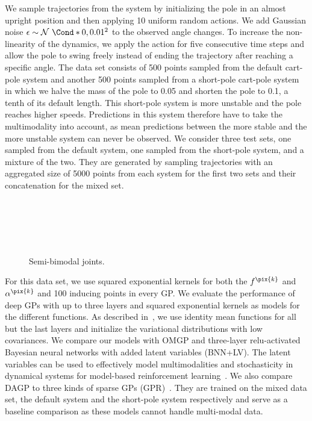 We sample trajectories from the system by initializing the pole in an almost upright position and then applying 10 uniform random actions.
We add Gaussian noise $\epsilon \sim \Gaussian*{0, 0.01^2}$ to the observed angle changes.
To increase the non-linearity of the dynamics, we apply the action for five consecutive time steps and allow the pole to swing freely instead of ending the trajectory after reaching a specific angle.
The data set consists of 500 points sampled from the default cart-pole system and another 500 points sampled from a short-pole cart-pole system in which we halve the mass of the pole to 0.05 and shorten the pole to 0.1, a tenth of its default length.
This short-pole system is more unstable and the pole reaches higher speeds.
Predictions in this system therefore have to take the multimodality into account, as mean predictions between the more stable and the more unstable system can never be observed.
We consider three test sets, one sampled from the default system, one sampled from the short-pole system, and a mixture of the two.
They are generated by sampling trajectories with an aggregated size of 5000 points from each system for the first two sets and their concatenation for the mixed set.
%
\begin{figure}[tp]
    \centering
    \\%
    \\%
    \\%
    \\%
    \caption[DAGP model symmetries]{
        \label{fig:data_association:semi_bimodal_multiple}
        Semi-bimodal joints.
    }
\end{figure}
%

For this data set, we use squared exponential kernels for both the $f^{\pix{k}}$ and $\alpha^{\pix{k}}$ and 100 inducing points in every GP.
We evaluate the performance of deep GPs with up to three layers and squared exponential kernels as models for the different functions.
As described in~\parencite{salimbeni_doubly_2017,kaiser_bayesian_2018}, we use identity mean functions for all but the last layers and initialize the variational distributions with low covariances.
We compare our models with OMGP and three-layer relu-activated Bayesian neural networks with added latent variables (BNN+LV).
The latent variables can be used to effectively model multimodalities and stochasticity in dynamical systems for model-based reinforcement learning~\parencite{depeweg_decomposition_2018}.
We also compare DAGP to three kinds of sparse GPs (GPR)~\parencite{hensman_scalable_2015}.
They are trained on the mixed data set, the default system and the short-pole system respectively and serve as a baseline comparison as these models cannot handle multi-modal data.

